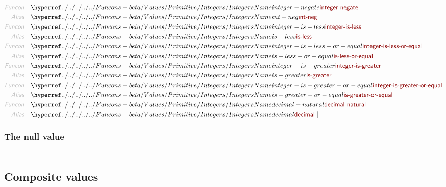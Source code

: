 \begin{align*}
  \KEY{Funcon} \quad & \NAMEHYPER{../../../../../Funcons-beta/Values/Primitive}{Integers}{integer-negate} \\
  \KEY{Alias} \quad & \NAMEHYPER{../../../../../Funcons-beta/Values/Primitive}{Integers}{int-neg} \\
  \KEY{Funcon} \quad & \NAMEHYPER{../../../../../Funcons-beta/Values/Primitive}{Integers}{integer-is-less} \\
  \KEY{Alias} \quad & \NAMEHYPER{../../../../../Funcons-beta/Values/Primitive}{Integers}{is-less} \\
  \KEY{Funcon} \quad & \NAMEHYPER{../../../../../Funcons-beta/Values/Primitive}{Integers}{integer-is-less-or-equal} \\
  \KEY{Alias} \quad & \NAMEHYPER{../../../../../Funcons-beta/Values/Primitive}{Integers}{is-less-or-equal} \\
  \KEY{Funcon} \quad & \NAMEHYPER{../../../../../Funcons-beta/Values/Primitive}{Integers}{integer-is-greater} \\
  \KEY{Alias} \quad & \NAMEHYPER{../../../../../Funcons-beta/Values/Primitive}{Integers}{is-greater} \\
  \KEY{Funcon} \quad & \NAMEHYPER{../../../../../Funcons-beta/Values/Primitive}{Integers}{integer-is-greater-or-equal} \\
  \KEY{Alias} \quad & \NAMEHYPER{../../../../../Funcons-beta/Values/Primitive}{Integers}{is-greater-or-equal} \\
  \KEY{Funcon} \quad & \NAMEHYPER{../../../../../Funcons-beta/Values/Primitive}{Integers}{decimal-natural} \\
  \KEY{Alias} \quad & \NAMEHYPER{../../../../../Funcons-beta/Values/Primitive}{Integers}{decimal}
  \ ]
\end{align*}
\subsubsection{The null value}\hypertarget{the-null-value}{}\label{the-null-value}

\begin{align*}
  [ \
  \KEY{Datatype} \quad & \NAMEHYPER{../../../../../Funcons-beta/Values/Primitive}{Null}{null-type} \\
  \KEY{Funcon} \quad & \NAMEHYPER{../../../../../Funcons-beta/Values/Primitive}{Null}{null-value} \\
  \KEY{Alias} \quad & \NAMEHYPER{../../../../../Funcons-beta/Values/Primitive}{Null}{null}
  \ ]
\end{align*}
\subsection{Composite values}\hypertarget{composite-values}{}\label{composite-values}

